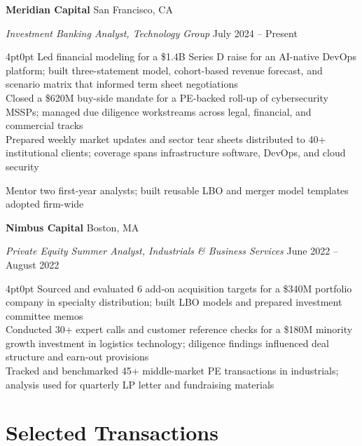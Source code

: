 \documentclass[10pt,letterpaper]{article}
\newcommand{\cvitem}[2]{%
  \textbf{#1} \hfill {\footnotesize\color{cvgray}#2}\par
}
\newcommand{\cvsubitem}[2]{%
  {\footnotesize\textit{#1}} \hfill {\footnotesize\color{cvgray}#2}\par
}
\newcommand{\cvbullet}[1]{%
  \hspace{4pt}{\footnotesize\color{cvrule}$\bullet$} {\small#1}\par
}
\newcommand{\cvbulletkern}[1]{%
  \hspace{4pt}{\footnotesize\color{cvrule}$\bullet$} {\small#1}\\[0.5pt]
}
\begin{document}
\cvitem{Meridian Capital}{San Francisco, CA}
\cvsubitem{Investment Banking Analyst, Technology Group}{July 2024 -- Present}

\begin{adjustwidth}{4pt}{0pt}
\cvbulletkern{Led financial modeling for a \$1.4B Series D raise for an AI-native DevOps platform; built three-statement model, cohort-based revenue forecast, and scenario matrix that informed term sheet negotiations}
\cvbulletkern{Closed a \$620M buy-side mandate for a PE-backed roll-up of cybersecurity MSSPs; managed due diligence workstreams across legal, financial, and commercial tracks}
\cvbullet{Prepared weekly market updates and sector tear sheets distributed to 40+ institutional clients; coverage spans infrastructure software, DevOps, and cloud security}
\cvbullet{Mentor two first-year analysts; built reusable LBO and merger model templates adopted firm-wide}
\end{adjustwidth}

\cvitem{Nimbus Capital}{Boston, MA}
\cvsubitem{Private Equity Summer Analyst, Industrials \& Business Services}{June 2022 -- August 2022}

\begin{adjustwidth}{4pt}{0pt}
\cvbulletkern{Sourced and evaluated 6 add-on acquisition targets for a \$340M portfolio company in specialty distribution; built LBO models and prepared investment committee memos}
\cvbulletkern{Conducted 30+ expert calls and customer reference checks for a \$180M minority growth investment in logistics technology; diligence findings influenced deal structure and earn-out provisions}
\cvbullet{Tracked and benchmarked 45+ middle-market PE transactions in industrials; analysis used for quarterly LP letter and fundraising materials}
\end{adjustwidth}

\section{Selected Transactions}
\end{document}

